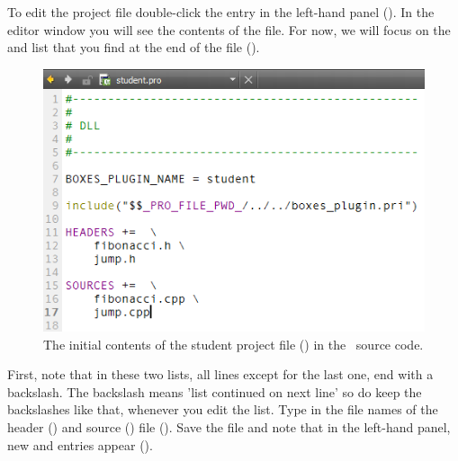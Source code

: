 To edit the  project file double-click the  entry in the left-hand panel (). In the editor window you will see the contents of the  file. For now, we will focus on the  and  list that you find at the end of the file ().

\begin{figure}
\centering
\includegraphics[scale=0.7]{graphics/qt-creator-project-file-1}
\caption{The initial contents of the student project file () in the \US\ source code.}
\label{fig:qt-creator-project-file-1}
\end{figure}

First, note that in these two lists, all lines except for the last one, end with a backslash. The backslash means 'list continued on next line' so do keep the backslashes like that, whenever you edit the list. Type in the file names of the  header () and source () file (). Save the file and note that in the left-hand panel, new  and  entries appear ().

